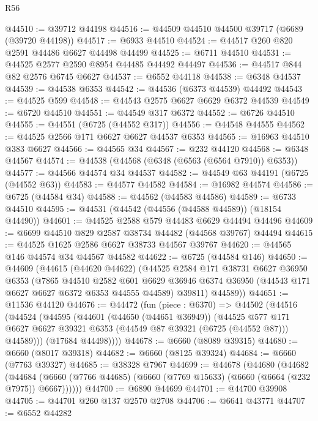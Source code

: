 \begin{lexlean}{R56}
\begin{coremodule}
@44510 := @39712 @44198
@44516 := @44509 @44510 @44500 @39717 (@6689 (@39720 @44198))
@44517 := @6933 @44510
@44524 := @44517 @260 @820 @2591 @44486 @6627 @44498 @44499
@44525 := @6711 @44510
@44531 := @44525 @2577 @2590 @8954 @44485 @44492 @44497
@44536 := @44517 @844 @82 @2576 @6745 @6627
@44537 := @6552 @44118
@44538 := @6348 @44537
@44539 := @44538 @6353
@44542 := @44536 (@6373 @44539) @44492
@44543 := @44525 @599
@44548 := @44543 @2575 @6627 @6629 @6372 @44539
@44549 := @6720 @44510
@44551 := @44549 @317 @6372
@44552 := @6726 @44510
@44555 := @44551 (@6725 (@44552 @317))
@44556 := @44548 @44555
@44562 := @44525 @2566 @171 @6627 @6627 @44537 @6353
@44565 := @16963 @44510 @383 @6627
@44566 := @44565 @34
@44567 := @232 @44120
@44568 := @6348 @44567
@44574 := @44538 (@44568 (@6348 (@6563 (@6564 @7910)) @6353))
@44577 := @44566 @44574 @34 @44537
@44582 := @44549 @63 @44191 (@6725 (@44552 @63))
@44583 := @44577 @44582
@44584 := @16982 @44574
@44586 := @6725 (@44584 @34)
@44588 := @44562 (@44583 @44586)
@44589 := @6733 @44510
@44595 := @44531 (@44542 (@44556 (@44588 @44589)) (@18154 @44490))
@44601 := @44525 @2588 @579 @44483 @6629 @44494 @44496
@44609 := @6699 @44510 @829 @2587 @38734 @44482 (@44568 @39767) @44494
@44615 := @44525 @1625 @2586 @6627 @38733 @44567 @39767
@44620 := @44565 @146 @44574 @34 @44567 @44582
@44622 := @6725 (@44584 @146)
@44650 := @44609
    (@44615
      (@44620 @44622)
      (@44525
        @2584
        @171
        @38731
        @6627
        @36950
        @6353
        (@7865
          @44510
          @2582
          @601
          @6629
          @36946
          @6374
          @36950
          (@44543 @171 @6627 @6627 @6372 @6353 @44555 @44589)
          @39811)
        @44589))
@44651 := @11536 @44120
@44676 := @44472
    (fun (piece : @6370) =>
    @44502
      (@44516
        (@44524
          (@44595
            (@44601
              (@44650 (@44651 @36949))
              (@44525
                @577
                @171
                @6627
                @6627
                @39321
                @6353
                (@44549 @87 @39321 (@6725 (@44552 @87)))
                @44589)))
          (@17684 @44498))))
@44678 := @6660 (@8089 @39315)
@44680 := @6660 (@8017 @39318)
@44682 := @6660 (@8125 @39324)
@44684 := @6660 (@7763 @39327)
@44685 := @38328 @7967
@44699 := @44678
    (@44680
      (@44682
        (@44684 (@6660 (@7766 @44685) (@6660 (@7769 @15633) (@6660 (@6664 (@232 @7975)) @6667))))))
@44700 := @6890 @44699
@44701 := @44700 @39908
@44705 := @44701 @260 @137 @2570 @2708
@44706 := @6641 @43771
@44707 := @6552 @44282

\end{coremodule}
\end{lexlean}
